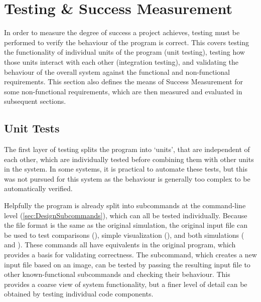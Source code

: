\chapter{Testing \& Success Measurement}\label{sec:Testing}
In order to measure the degree of success a project achieves, testing must be performed to verify the behaviour of the program is correct.
This covers testing the functionality of individual units of the program (unit testing), testing how those units interact with each other (integration testing), and validating the behaviour of the overall system against the functional and non-functional requirements\cite{LevelsOfTesting}.
This section also defines the means of Success Measurement for some non-functional requirements, which are then measured and evaluated in subsequent sections.%

\section{Unit Tests}
The first layer of testing splits the program into `units', that are independent of each other, which are individually tested before combining them with other units in the system.
In some systems, it is practical to automate these tests, but this was not pursued for this system as the behaviour is generally too complex to be automatically verified.

Helpfully the program is already split into subcommands at the command-line level (\cref{sec:DesignSubcommands}), which can all be tested individually.
Because the file format is the same as the original simulation, the original input file can be used to test comparisons (), simple visualization (), and both simulations ( and ).
These commands all have equivalents in the original program, which provides a basis for validating correctness.
The  subcommand, which creates a new input file based on an image, can be tested by passing the resulting input file to other known-functional subcommands and checking their behaviour.
This provides a coarse view of system functionality, but a finer level of detail can be obtained by testing individual code components.

